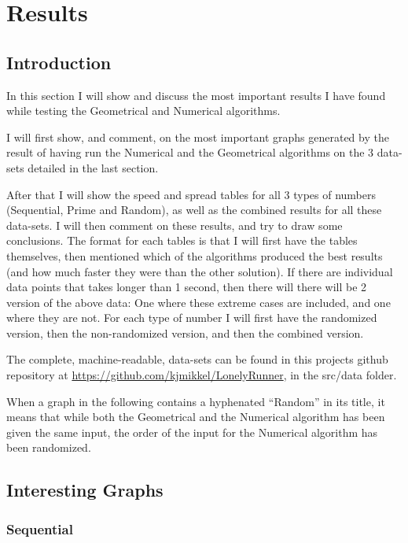 \section{Results}
\label{results}

\subsection{Introduction}
In this section I will show and discuss the most important results I have found while testing the Geometrical and Numerical algorithms. 

I will first show, and comment, on the most important graphs generated by the result of having run the Numerical and the Geometrical algorithms on the 3 data-sets detailed in the last section.

After that I will show the speed and spread tables for all 3 types of numbers (Sequential, Prime and Random), as well as the combined results for all these data-sets. I will then comment on these results, and try to draw some conclusions. The format for each tables is that I will first have the tables themselves, then mentioned which of the algorithms produced the best results (and how much faster they were than the other solution). If there are individual data points that takes longer than 1 second, then there will there will be 2 version of the above data: One where these extreme cases are included, and one where they are not. For each type of number I will first have the randomized version, then the non-randomized version, and then the combined version.

The complete, machine-readable, data-sets can be found in this projects github repository at \underline{https://github.com/kjmikkel/LonelyRunner}, in the src/data folder.

When a graph in the following contains a hyphenated ``Random'' in its title, it means that while both the Geometrical and the Numerical algorithm has been given the same input, the order of the input for the Numerical algorithm has been randomized. 

\subsection{Interesting Graphs}

\subsubsection{Sequential}

